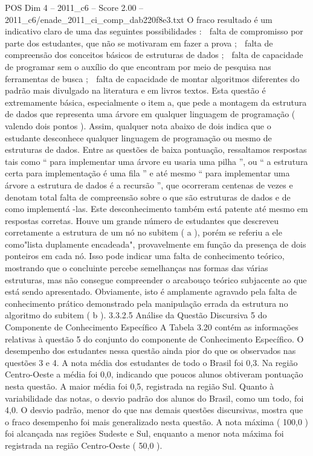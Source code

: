 \begin{textsample}{POS Dim 4 – 2011\_c6 – Score 2.00 – 2011\_c6/enade\_2011\_ci\_comp\_dab220f8e3.txt}
O fraco resultado é um indicativo claro de uma das seguintes possibilidades :  falta de compromisso por parte dos estudantes, que não se motivaram em fazer a prova ;  falta de compreensão dos conceitos básicos de estruturas de dados ;  falta de capacidade de programar sem o auxílio do que encontram por meio de pesquisa nas ferramentas de busca ;  falta de capacidade de montar algoritmos diferentes do padrão mais divulgado na literatura e em livros textos.
Esta questão é extremamente básica, especialmente o item a, que pede a montagem da estrutura de dados que representa uma árvore em qualquer linguagem de programação ( valendo dois pontos ).
Assim, qualquer nota abaixo de dois indica que o estudante desconhece qualquer linguagem de programação ou mesmo de estruturas de dados.
Entre as questões de baixa pontuação, ressaltamos respostas tais como “ para implementar uma árvore eu usaria uma pilha ”, ou “ a estrutura certa para implementação é uma fila ” e até mesmo “ para implementar uma árvore a estrutura de dados é a recursão ”, que ocorreram centenas de vezes e denotam total falta de compreensão sobre o que são estruturas de dados e de como implementá -las.
Este desconhecimento também está patente até mesmo em respostas corretas.
Houve um grande número de estudantes que descreveu corretamente a estrutura de um nó no subitem ( a ), porém se referiu a ele como"lista duplamente encadeada", provavelmente em função da presença de dois ponteiros em cada nó.
Isso pode indicar uma falta de conhecimento teórico, mostrando que o concluinte percebe semelhanças nas formas das várias estruturas, mas não consegue compreender o arcabouço teórico subjacente ao que está sendo apresentado.
Obviamente, isto é amplamente agravado pela falta de conhecimento prático demonstrado pela manipulação errada da estrutura no algoritmo do subitem ( b ). 3.3.2.5 Análise da Questão Discursiva 5 do Componente de Conhecimento Específico A Tabela 3.20 contém as informações relativas à questão 5 do conjunto do componente de Conhecimento Específico.
O desempenho dos estudantes nessa questão ainda pior do que os observados nas questões 3 e 4.
A nota média dos estudantes de todo o Brasil foi 0,3.
Na região Centro-Oeste a média foi 0,0, indicando que poucos alunos obtiveram pontuação nesta questão.
A maior média foi 0,5, registrada na região Sul.
Quanto à variabilidade das notas, o desvio padrão dos alunos do Brasil, como um todo, foi 4,0.
O desvio padrão, menor do que nas demais questões discursivas, mostra que o fraco desempenho foi mais generalizado nesta questão.
A nota máxima ( 100,0 ) foi alcançada nas regiões Sudeste e Sul, enquanto a menor nota máxima foi registrada na região Centro-Oeste ( 50,0 ).

\end{textsample}
